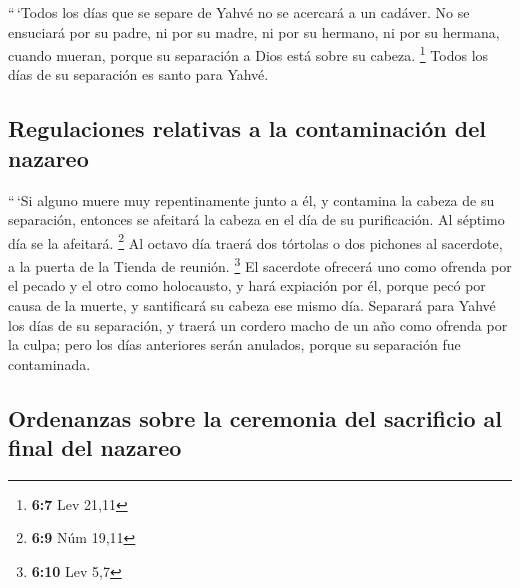 \begin{paracol}{2}
 ``\,`Todos los días que se separe de Yahvé no se acercará
a un cadáver.  No se ensuciará por su padre, ni por su
madre, ni por su hermano, ni por su hermana, cuando mueran, porque su
separación a Dios está sobre su cabeza. \footnote{\textbf{6:7} Lev 21,11}
 Todos los días de su separación es santo para Yahvé.

\hypertarget{regulaciones-relativas-a-la-contaminaciuxf3n-del-nazareo}{%
\subsection{Regulaciones relativas a la contaminación del
nazareo}\label{regulaciones-relativas-a-la-contaminaciuxf3n-del-nazareo}}

 ``\,`Si alguno muere muy repentinamente junto a él, y
contamina la cabeza de su separación, entonces se afeitará la cabeza en
el día de su purificación. Al séptimo día se la afeitará. \footnote{\textbf{6:9}
  Núm 19,11}  Al octavo día traerá dos tórtolas o dos
pichones al sacerdote, a la puerta de la Tienda de reunión. \footnote{\textbf{6:10}
  Lev 5,7}  El sacerdote ofrecerá uno como ofrenda por el
pecado y el otro como holocausto, y hará expiación por él, porque pecó
por causa de la muerte, y santificará su cabeza ese mismo día.
 Separará para Yahvé los días de su separación, y traerá
un cordero macho de un año como ofrenda por la culpa; pero los días
anteriores serán anulados, porque su separación fue contaminada.

\hypertarget{ordenanzas-sobre-la-ceremonia-del-sacrificio-al-final-del-nazareo}{%
\subsection{Ordenanzas sobre la ceremonia del sacrificio al final del
nazareo}\label{ordenanzas-sobre-la-ceremonia-del-sacrificio-al-final-del-nazareo}}


\end{paracol}
